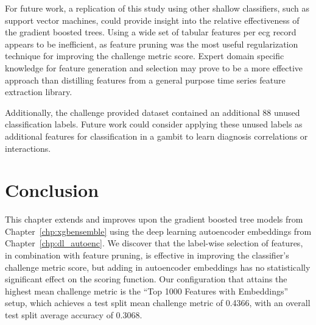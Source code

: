 \documentclass[\main/thesis.tex]{subfiles}
\begin{document}
For future work, a replication of this study using other shallow classifiers, such as support vector machines, could provide insight into the relative effectiveness of the gradient boosted trees.
Using a wide set of tabular features per \gls{ecg} record appears to be inefficient, as feature pruning was the most useful regularization technique for improving the challenge metric score.
Expert domain specific knowledge for feature generation and selection may prove to be a more effective approach than distilling features from a general purpose time series feature extraction library.

Additionally, the challenge provided dataset contained an additional 88 unused classification labels.
Future work could consider applying these unused labels as additional features for classification in a gambit to learn diagnosis correlations or interactions.

\section{Conclusion}
This chapter extends and improves upon the gradient boosted tree models from Chapter~\ref{chp:xgbensemble} using the deep learning autoencoder embeddings from Chapter~\ref{chp:dl_autoenc}.
We discover that the label-wise selection of features, in combination with feature pruning, is effective in improving the classifier's challenge metric score, but adding in autoencoder embeddings has no statistically significant effect on the scoring function.
Our configuration that attains the highest mean challenge metric is the ``Top 1000 Features with Embeddings'' setup, which achieves a test split mean challenge metric of 0.4366, with an overall test split average accuracy of 0.3068.
\end{document}
